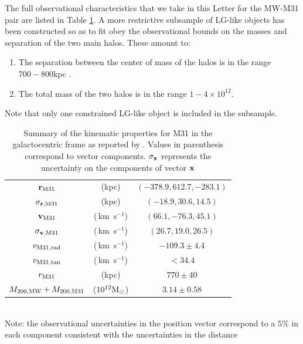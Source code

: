 \documentclass{emulateapj}
\newcommand{\kms}{\,km~s$^{-1}$}
\newcommand{\Msun}{{\ifmmode{{\rm {M_{\odot}}}}\else{${\rm{M_{\odot}}}$}\fi}}
\begin{document}
The full observational characteristics that we take in this Letter for the MW-M31 pair are listed in Table \ref{table:1}. 
A more restrictive subsample of LG-like objects has been constructed so as to fit obey the observational bounds on the masses and separation of the two main halos. These amount to: %
\begin{enumerate}
\item The separation between the center of mass of the halos is in the range $700-800$kpc \citep{ribas05,vanderMarel08}.
\item The total mass of the two halos is in the range $1-4\times 10^{12}$\Msun \citep{vanderMarel12}.
\end{enumerate}
Note that only one constrained LG-like object is included in the subsample.%


\begin{table}
\caption{Summary of the kinematic properties for M31 in the galactocentric frame as reported by \citep{vanderMarel12}. Values in parenthesis correspond to vector components. $\sigma_{\bf x}$ represents the uncertainty on the components of vector ${\bf x}$}
\begin{center}
\begin{tabular}{ccc}\hline\hline
${\bf r}_{\rm M31}$ & (kpc) &$(-378.9, 612.7, -283.1)$\\
$\sigma_{{\bf r}, {\rm M31}}$ & (kpc) &$(-18.9, 30.6, 14.5)$\\
${\bf v}_{\rm M31}$ & (\kms) & $(66.1, -76.3, 45.1)$\\
$\sigma_{{\bf v},{\rm M31}}$ & (\kms) &$(26.7, 19.0, 26.5)$\\
$v_{\rm M31,rad}$ &(\kms) & $-109.3\pm 4.4$\\
$v_{\rm M31,tan}$ &(\kms) & $<34.4$\\
$r_{\rm M31}$ &(kpc) & $770\pm 40$\\
$M_{\rm 200,MW} + M_{\rm 200, M31}$ & ($10^{12}\Msun$) & $3.14\pm 0.58$\\\hline
\end{tabular}\\
\vspace{1mm}
Note: the observational uncertainties in the position vector correspond to a $5\%$ in each component consistent with the uncertainties in the distance \citep[see references in][]{vanderMarel08}
\end{center}
\label{table:1}
\end{table}
\end{document}
